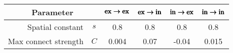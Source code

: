 

\begin{tabular}{rccccc}
    \hline
    \multicolumn{2}{c}{\textbf{Parameter}} & 
    \textbf{$\pmb{\mathrm{ex} \to \mathrm{ex}}$} & 
    \textbf{$\pmb{\mathrm{ex} \to \mathrm{in}}$} &
    \textbf{$\pmb{\mathrm{in} \to \mathrm{ex}}$} &
    \textbf{$\pmb{\mathrm{in} \to \mathrm{in}}$} 
    \\ \hline
    Spatial constant & $s$ & 0.8 & 0.8 & 0.8 & 0.8  
    \\
    Max connect strength & $C$ & 0.004 & 0.07 & -0.04 & 0.015 
    \\ \hline
\end{tabular}